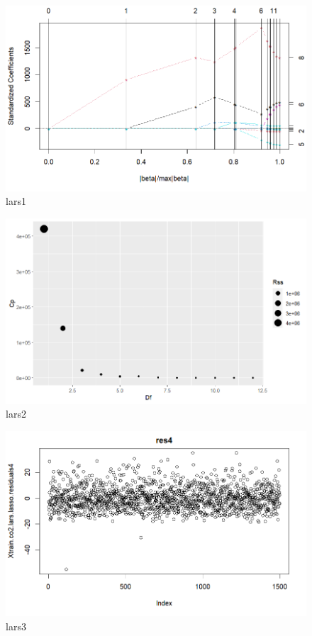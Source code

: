 \documentclass{article}
\begin{document}
\begin{figure}[h!]
        \centering
        \includegraphics[width=1.1\textwidth]{../plots/lars1.png}
        \caption{lars1}
        \label{fig:lars1}
\end{figure}

\begin{figure}[h!]
        \centering
        \includegraphics[width=1.1\textwidth]{../plots/lars2.png}
        \caption{lars2}
        \label{fig:lars2}
\end{figure}

\begin{figure}[h!]
        \centering
        \includegraphics[width=1.1\textwidth]{../plots/lars3.png}
        \caption{lars3}
        \label{fig:lars3}
\end{figure}
\end{document}
